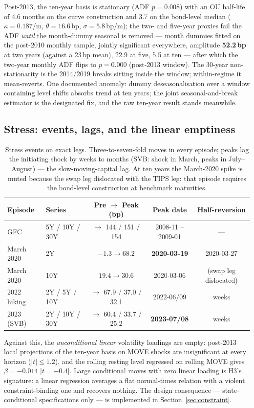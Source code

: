 \documentclass[11pt]{article}
\begin{document}
Post-2013, the ten-year basis is stationary (ADF $p=0.008$) with an OU half-life of 4.6 months on the curve construction and 3.7 on the bond-level median ($\kappa=0.187$/m, $\theta=16.6$\,bp, $\sigma=5.8$\,bp/m); the two- and five-year proxies fail the ADF \emph{until} the month-dummy seasonal is removed --- month dummies fitted on the post-2010 monthly sample, jointly significant everywhere, amplitude \textbf{52.2\,bp} at two years (against a 23\,bp mean), 22.9 at five, 5.5 at ten --- after which the two-year monthly ADF flips to $p=0.000$ (post-2013 window). The 30-year non-stationarity is the 2014/2019 breaks sitting inside the window; within-regime it mean-reverts. One documented anomaly: dummy deseasonalisation over a window containing level shifts absorbs trend at ten years; the joint seasonal-and-break estimator is the designated fix, and the raw ten-year result stands meanwhile.

\subsection{Stress: events, lags, and the linear emptiness}

\begin{table}[h!]
\centering\small
\begin{tabular}{llccc}
\toprule
Episode & Series & Pre $\to$ Peak (bp) & Peak date & Half-reversion \\
\midrule
GFC & 5Y / 10Y / 30Y & $\to$ 144 / 151 / 154 & 2008-11 -- 2009-01 & --- \\
March 2020 & 2Y & $-1.3\to68.2$ & \textbf{2020-03-19} & 2020-03-27 \\
March 2020 & 10Y & $19.4\to30.6$ & 2020-03-06 & (swap leg dislocated) \\
2022 hiking & 2Y / 5Y / 10Y & $\to$ 67.9 / 37.0 / 32.1 & 2022-06/09 & weeks \\
2023 (SVB) & 2Y / 10Y / 30Y & $\to$ 60.4 / 33.7 / 25.2 & \textbf{2023-07/08} & weeks \\
\bottomrule
\end{tabular}
\caption{Stress events on exact legs. Three-to-seven-fold moves in every episode; peaks lag the initiating shock by weeks to months (SVB: shock in March, peaks in July--August) --- the slow-moving-capital lag. At ten years the March-2020 spike is muted because the swap leg dislocated with the TIPS leg: that episode requires the bond-level construction at benchmark maturities.}
\end{table}

Against this, the \emph{unconditional linear} volatility loadings are empty: post-2013 local projections of the ten-year basis on MOVE shocks are insignificant at every horizon ($|t|\le1.2$), and the rolling resting level regressed on rolling MOVE gives $\beta=-0.014$ [$t=-0.4$]. Large conditional moves with zero linear loading is H3's signature: a linear regression averages a flat normal-times relation with a violent constraint-binding one and recovers nothing. The design consequence --- state-conditional specifications only --- is implemented in Section~\ref{sec:constraint}.
\end{document}
